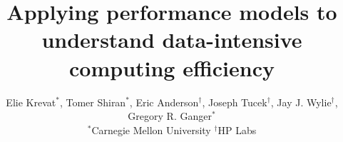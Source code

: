 \title{Applying performance models to understand data-intensive computing efficiency}

\author{\rm Elie Krevat$^\ast$, Tomer Shiran$^\ast$, Eric
Anderson$^\dagger$, Joseph Tucek$^\dagger$, Jay J. Wylie$^\dagger$, Gregory R. Ganger$^\ast$ \\
$^\ast$Carnegie Mellon University $^\dagger$HP Labs}


\maketitle

\thispagestyle{empty}
